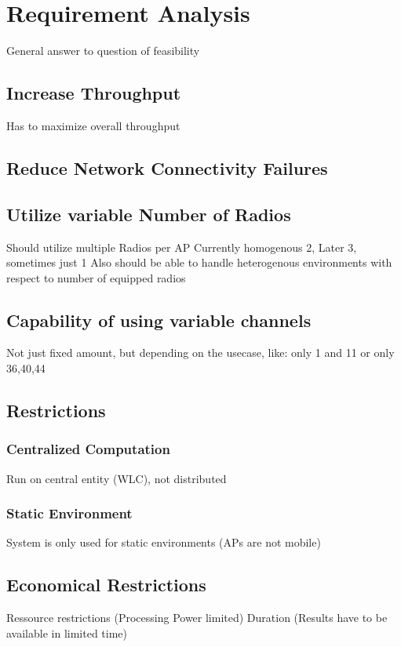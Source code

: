 \chapter{Requirement Analysis}
General answer to question of feasibility
  \section{Increase Throughput}
  Has to maximize overall throughput\newline
  \section{Reduce Network Connectivity Failures}
\section{Utilize variable Number of Radios}
  Should utilize multiple Radios per AP\newline
  Currently homogenous 2, Later 3, sometimes just 1 \newline
  Also should be able to handle heterogenous environments with respect to number of equipped radios \newline
  \section{Capability of using variable channels}
  Not just fixed amount, but depending on the usecase, like: only 1 and 11 or only 36,40,44
  \section{Restrictions}
  \subsection{Centralized Computation}
    Run on central entity (WLC), not distributed \newline 
  \subsection{Static Environment}
    System is only used for static environments (APs are not mobile) \newline
\section{Economical Restrictions}
  Ressource restrictions (Processing Power limited) \newline
  Duration (Results have to be available in limited time) \newline
